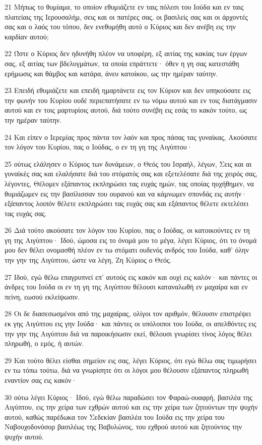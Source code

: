 \par 21 Μήπως το θυμίαμα, το οποίον εθυμιάζετε εν ταις πόλεσι του Ιούδα και εν ταις πλατείαις της Ιερουσαλήμ, σεις και οι πατέρες σας, οι βασιλείς σας και οι άρχοντές σας και ο λαός του τόπου, δεν ενεθυμήθη αυτό ο Κύριος και δεν ανέβη εις την καρδίαν αυτού;
\par 22 Ώστε ο Κύριος δεν ηδυνήθη πλέον να υποφέρη, εξ αιτίας της κακίας των έργων σας, εξ αιτίας των βδελυγμάτων, τα οποία επράττετε· όθεν η γη σας κατεστάθη ερήμωσις και θάμβος και κατάρα, άνευ κατοίκου, ως την ημέραν ταύτην.
\par 23 Επειδή εθυμιάζετε και επειδή ημαρτάνετε εις τον Κύριον και δεν υπηκούσατε εις την φωνήν του Κυρίου ουδέ περιεπατήσατε εν τω νόμω αυτού και εν τοις διατάγμασιν αυτού και εν τοις μαρτυρίοις αυτού, διά τούτο συνέβη εις εσάς το κακόν τούτο, ως την ημέραν ταύτην.
\par 24 Και είπεν ο Ιερεμίας προς πάντα τον λαόν και προς πάσας τας γυναίκας, Ακούσατε τον λόγον του Κυρίου, πας ο Ιούδας, ο εν τη γη της Αιγύπτου·
\par 25 ούτως ελάλησεν ο Κύριος των δυνάμεων, ο Θεός του Ισραήλ, λέγων, Σεις και αι γυναίκές σας και ελαλήσατε διά του στόματός σας και εξετελέσατε διά της χειρός σας, λέγοντες, Θέλομεν εξάπαντος εκπληρώσει τας ευχάς ημών, τας οποίας ηυχήθημεν, να θυμιάζωμεν εις την βασίλισσαν του ουρανού και να κάμνωμεν σπονδάς εις αυτήν· εξάπαντος λοιπόν θέλετε εκπληρώσει τας ευχάς σας και εξάπαντος θέλετε εκτελέσει τας ευχάς σας.
\par 26 Διά τούτο ακούσατε τον λόγον του Κυρίου, πας ο Ιούδας, οι κατοικούντες εν τη γη της Αιγύπτου· Ιδού, ώμοσα εις το όνομά μου το μέγα, λέγει Κύριος, ότι το όνομά μου δεν θέλει ονομασθή πλέον εν τω στόματι ουδενός ανδρός του Ιούδα, καθ' όλην την γην της Αιγύπτου, ώστε να λέγη, Ζη Κύριος ο Θεός.
\par 27 Ιδού, εγώ θέλω επαγρυπνεί επ' αυτούς εις κακόν και ουχί εις καλόν· και πάντες οι άνδρες του Ιούδα οι εν τη γη της Αιγύπτου θέλουσι καταναλωθή εν μαχαίρα και εν πείνη, εωσού εκλείψωσιν.
\par 28 Οι δε διασεσωσμένοι από της μαχαίρας, ολίγοι τον αριθμόν, θέλουσιν επιστρέψει εκ γης Αιγύπτου εις γην Ιούδα· και πάντες οι υπόλοιποι του Ιούδα, οι απελθόντες εις την γην της Αιγύπτου διά να παροικήσωσιν εκεί, θέλουσι γνωρίσει τίνος λόγος θέλει πληρωθή, ο εμός, ή αυτών.
\par 29 Και τούτο θέλει είσθαι σημείον εις σας, λέγει Κύριος, ότι εγώ θέλω σας τιμωρήσει εν τω τόπω τούτω, διά να γνωρίσητε ότι οι λόγοι μου θέλουσιν εξάπαντος πληρωθή εναντίον σας εις κακόν·
\par 30 ούτω λέγει Κύριος· Ιδού, εγώ θέλω παραδώσει τον Φαραώ-ουαφρή, βασιλέα της Αιγύπτου, εις την χείρα των εχθρών αυτού και εις την χείρα των ζητούντων την ψυχήν αυτού, καθώς παρέδωκα τον Σεδεκίαν βασιλέα του Ιούδα εις την χείρα του Ναβουχοδονόσορ βασιλέως της Βαβυλώνος, του εχθρού αυτού και ζητούντος την ψυχήν αυτού.

